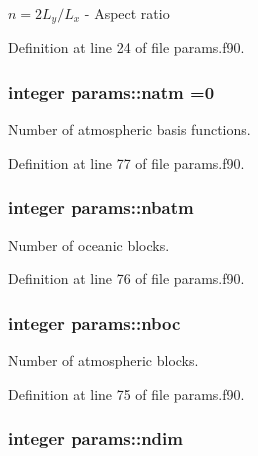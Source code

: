 $n = 2 L_y / L_x$ -\/ Aspect ratio 



Definition at line 24 of file params.\-f90.

\hypertarget{classparams_a4f46551b6a8ad183d2dced1da3dc5fed}{
\subsubsection[{natm}]{\setlength{\rightskip}{0pt plus 5cm}integer params\-::natm =0}}\label{classparams_a4f46551b6a8ad183d2dced1da3dc5fed}


Number of atmospheric basis functions. 



Definition at line 77 of file params.\-f90.

\hypertarget{classparams_aa5dc201b0a59d8bb25a5dc52d2ed3cac}{
\subsubsection[{nbatm}]{\setlength{\rightskip}{0pt plus 5cm}integer params\-::nbatm}}\label{classparams_aa5dc201b0a59d8bb25a5dc52d2ed3cac}


Number of oceanic blocks. 



Definition at line 76 of file params.\-f90.

\hypertarget{classparams_a54123b5a947703d21d0c882dec6780ac}{
\subsubsection[{nboc}]{\setlength{\rightskip}{0pt plus 5cm}integer params\-::nboc}}\label{classparams_a54123b5a947703d21d0c882dec6780ac}


Number of atmospheric blocks. 



Definition at line 75 of file params.\-f90.

\hypertarget{classparams_a2323fe1773f086e20c14f266351c482b}{
\subsubsection[{ndim}]{\setlength{\rightskip}{0pt plus 5cm}integer params\-::ndim}}\label{classparams_a2323fe1773f086e20c14f266351c482b}


